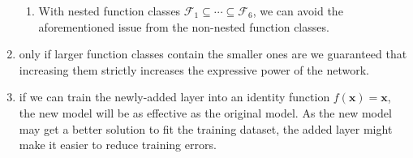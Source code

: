 \begin{enumerate}[itemsep=0.15cm]
\begin{enumerate}
        \item With nested function classes $\mathcal{F}_1 \subseteq \cdots \subseteq \mathcal{F}_6$, we can avoid the aforementioned issue from the non-nested function classes.

    \end{enumerate}

    \item only if larger function classes contain the smaller ones are we guaranteed that increasing them strictly increases the expressive power of the network.

    \item if we can train the newly-added layer into an identity function $f(\mathbf{x}) = \mathbf{x}$, the new model will be as effective as the original model. As the new model may get a better solution to fit the training dataset, the added layer might make it easier to reduce training errors.


\end{enumerate}





































